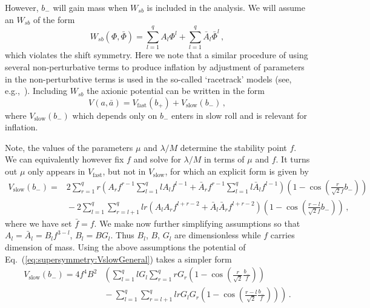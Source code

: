 \documentclass[12pt]{article}
\begin{document}
However, $b_-$ will gain mass when $W_{sb}$ is included in the analysis.
We will assume an $W_{sb}$ of the form
\begin{equation} \label{eq:supersymmetry:Wsb}
  W_{sb}\left(\Phi, \bar\Phi\right) =
      \sum_{l = 1}^q A_l \Phi^l
    + \sum_{l = 1}^q \bar A_l \bar\Phi^l\,,
\end{equation}
which violates the shift symmetry.
Here we note that a similar procedure of using several non-perturbative terms to produce inflation by adjustment of parameters in the non-perturbative terms is used in the so-called `racetrack' models (see, e.g.,~\cite{BlancoPillado:2004ns, Lalak:2005hr, Greene:2005rn, BlancoPillado:2006he}).
Including $W_{sb}$ the axionic potential can be written in the form
\begin{equation}
  V\left(a, \bar a\right) = V_\text{fast}\left(b_+\right) + V_\text{slow}\left(b_-\right)\,,
\end{equation}
where $V_\text{slow}\left(b_-\right)$ which depends only on $b_-$ enters in slow roll and is relevant for inflation.

Note, the values of the parameters $\mu$ and $\lambda / M$ determine the stability point $f$.
We can equivalently however fix $f$ and solve for $\lambda / M$ in terms of $\mu$ and $f$.
It turns out $\mu$ only appears in $V_\text{fast}$, but not in $V_\text{slow}$, for which an explicit form is given by
\begin{equation} \label{eq:supersymmetry:VslowGeneral}
  \begin{aligned}
    V_\text{slow}\left(b_-\right) =
      &2 \sum_{r = 1}^q r
        \left(A_r f^{r - 1} \sum_{l = 1}^q l A_l f^{l - 1}
          + \bar A_r f^{r - 1} \sum_{l = 1}^q l \bar A_l f^{l - 1}\right)
        \left(1 - \cos\left(\frac{r}{\sqrt 2 f} b_-\right)\right)\\
      &{} - 2 \sum_{l = 1}^q \sum_{r = l + 1}^q
        l r \left(A_l A_r f^{l + r - 2} + \bar A_l \bar A_r f^{l + r - 2}\right)
        \left(1 - \cos\left(\frac{r - l}{\sqrt 2 f} b_-\right)\right)\,,
  \end{aligned}
\end{equation}
where we have set $\bar f = f$.
We make now further simplifying assumptions so that $A_l = \bar A_l = B_l f^{3 - l}$, $B_l = B G_l$.
Thus $B_l$, $B$, $G_l$ are dimensionless while $f$ carries dimension of mass.
Using the above assumptions the potential of Eq.~(\ref{eq:supersymmetry:VslowGeneral}) takes a simpler form
\begin{equation} \label{eq:supersymmetry:Vslow}
  \begin{aligned}
    V_\text{slow}\left(b_-\right) = 4 f^4 B^2 &\left(
      \sum_{l = 1}^q l G_l \sum_{r = 1}^q r G_r
        \left(1 - \cos\left(\frac{r}{\sqrt{2}} \frac{b_-}{f}\right)\right)\right. \\
      &\left.{} - \sum_{l = 1}^q \sum_{r = l + 1}^q l r G_l G_r
        \left(1 - \cos\left(\frac{r - l}{\sqrt{2}} \frac{b_-}{f}\right)\right)
    \right)\,.
  \end{aligned}
\end{equation}
\end{document}
